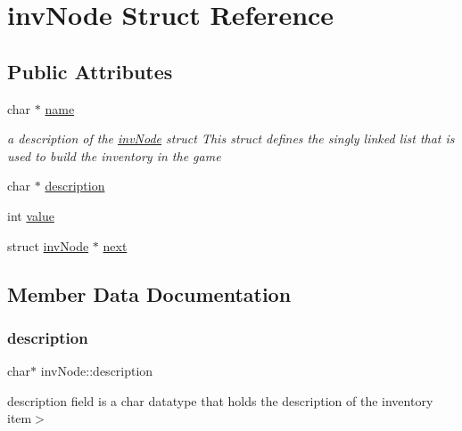 \hypertarget{structinvNode}{}\section{inv\+Node Struct Reference}
\label{structinvNode}
\subsection*{Public Attributes}
\begin{DoxyCompactItemize}
\item 
char $\ast$ \mbox{\hyperlink{structinvNode_a8bc8ca373d634a94df123e849ea445d7}{name}}
\begin{DoxyCompactList}\small\item\em a description of the \mbox{\hyperlink{structinvNode}{inv\+Node}} struct This struct defines the singly linked list that is used to build the inventory in the game \end{DoxyCompactList}\item 
char $\ast$ \mbox{\hyperlink{structinvNode_a4d62670766c4db6bb246e12f7b0f8491}{description}}
\item 
int \mbox{\hyperlink{structinvNode_a09ea57682fef12ccee24772ab4fa539c}{value}}
\item 
struct \mbox{\hyperlink{structinvNode}{inv\+Node}} $\ast$ \mbox{\hyperlink{structinvNode_a261fbbb63377c455aebbe3125a094f2a}{next}}
\end{DoxyCompactItemize}


\subsection{Member Data Documentation}
\mbox{\label{structinvNode_a4d62670766c4db6bb246e12f7b0f8491}} 
\subsubsection{\texorpdfstring{description}{description}}
{\footnotesize\ttfamily char$\ast$ inv\+Node\+::description}

description field is a char datatype that holds the description of the inventory item$>$ \mbox{\label{structinvNode_a8bc8ca373d634a94df123e849ea445d7}} 
